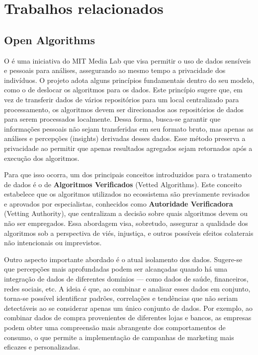 \chapter{Trabalhos relacionados}

\section{Open Algorithms}

O  é uma iniciativa do MIT Media Lab que visa permitir o uso de dados sensíveis e pessoais para análises, assegurando ao mesmo tempo a privacidade dos indivíduos. O projeto adota alguns princípios fundamentais dentro do seu modelo, como o de deslocar os algoritmos para os dados. Este princípio sugere que, em vez de transferir dados de vários repositórios para um local centralizado para processamento, os algoritmos devem ser direcionados aos repositórios de dados para serem processados localmente. Dessa forma, busca-se garantir que informações pessoais não sejam transferidas em seu formato bruto, mas apenas as análises e percepções (insights) derivadas desses dados. Esse método preserva a privacidade ao permitir que apenas resultados agregados sejam retornados após a execução dos algoritmos.

Para que isso ocorra, um dos principais conceitos introduzidos para o tratamento de dados é o de \textbf{Algoritmos Verificados} (Vetted Algorithms). Este conceito estabelece que os algoritmos utilizados no ecossistema são previamente revisados e aprovados por especialistas, conhecidos como \textbf{Autoridade Verificadora} (Vetting Authority), que centralizam a decisão sobre quais algoritmos devem ou não ser empregados. Essa abordagem visa, sobretudo, assegurar a qualidade dos algoritmos sob a perspectiva de viés, injustiça, e outros possíveis efeitos colaterais não intencionais ou imprevistos.

Outro aspecto importante abordado é o atual isolamento dos dados. Sugere-se que percepções mais aprofundadas podem ser alcançadas quando há uma integração de dados de diferentes domínios — como dados de saúde, financeiros, redes sociais, etc. A ideia é que, ao combinar e analisar esses dados em conjunto, torna-se possível identificar padrões, correlações e tendências que não seriam detectáveis ao se considerar apenas um único conjunto de dados. Por exemplo, ao combinar dados de compra provenientes de diferentes lojas e bancos, as empresas podem obter uma compreensão mais abrangente dos comportamentos de consumo, o que permite a implementação de campanhas de marketing mais eficazes e personalizadas.


